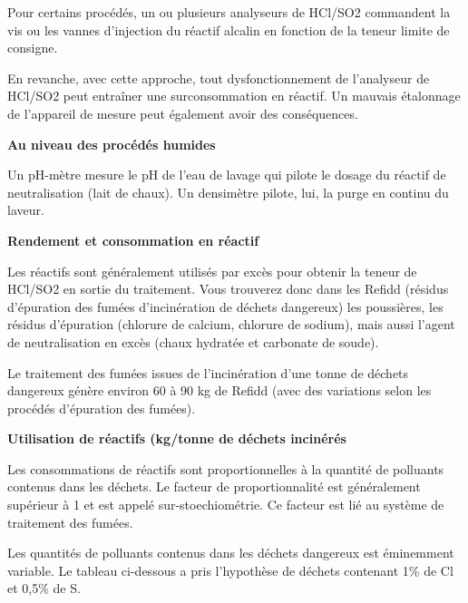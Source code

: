 Pour certains procédés, un ou plusieurs analyseurs de HCl/SO2 commandent la vis ou les vannes d’injection du réactif alcalin en fonction de la teneur limite de consigne.
\vspace{0.3cm}

En revanche, avec cette approche, tout dysfonctionnement de l’analyseur de HCl/SO2 peut entraîner une surconsommation en réactif.
Un mauvais étalonnage de l’appareil de mesure peut également avoir des conséquences.



\vspace{0.3cm}
\textbf{Au niveau des procédés humides}
\vspace{0.3cm}

Un pH-mètre mesure le pH de l’eau de lavage qui pilote le dosage du réactif de neutralisation (lait de chaux). Un densimètre pilote, lui, la purge en continu du laveur.


\vspace{0.3cm}
\textbf{Rendement et consommation en réactif}
\vspace{0.3cm}

Les réactifs sont généralement utilisés par excès pour obtenir la teneur de HCl/SO2 en sortie du traitement. Vous trouverez donc dans les Refidd (résidus d’épuration des fumées d’incinération de déchets dangereux) les poussières, les résidus d’épuration (chlorure de calcium, chlorure de sodium), mais aussi l’agent de neutralisation en excès (chaux hydratée et carbonate de soude). 
\vspace{0.3cm}

Le traitement des fumées issues de l’incinération d’une tonne de déchets dangereux génère environ 60 à 90 kg de Refidd (avec des variations selon les procédés d’épuration des fumées).


\vspace{0,3cm}
\textbf{Utilisation de réactifs (kg/tonne de déchets incinérés}
\vspace{0,3cm} 

Les consommations de réactifs sont proportionnelles à la quantité de polluants contenus dans les déchets. Le facteur de proportionnalité est généralement supérieur à 1 et est appelé sur-stoechiométrie. Ce facteur est lié au système de traitement des fumées.
\vspace{0.3cm}

Les quantités de polluants contenus dans les déchets dangereux est éminemment variable. Le tableau ci-dessous a pris l’hypothèse de déchets contenant 1\% de Cl et 0,5\% de S.



